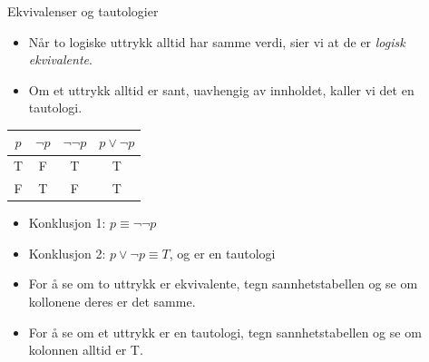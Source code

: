 \begin{frame}{Ekvivalenser og tautologier}
    \begin{itemize}
        \item Når to logiske uttrykk alltid har samme verdi, sier vi at de er \emph{logisk ekvivalente}.
        \item Om et uttrykk alltid er sant, uavhengig av innholdet, kaller vi det en tautologi.
    \end{itemize}
    \begin{tabular}{c|c|c|c}
         $p$ & $\lnot p$ & $\lnot \lnot p$ & $p \lor \lnot p$\\ \hline
         T & F & T & T\\
         F & T & F & T
    \end{tabular}
    \begin{itemize}
        \item Konklusjon 1: $p \equiv \lnot \lnot p$
        \item Konklusjon 2: $p \lor \lnot p \equiv T$, og er en tautologi
        \item For å se om to uttrykk er ekvivalente, tegn sannhetstabellen og se om kollonene deres er det samme.
        \item For å se om et uttrykk er en tautologi, tegn sannhetstabellen og se om kolonnen alltid er T.
    \end{itemize}
\end{frame}

